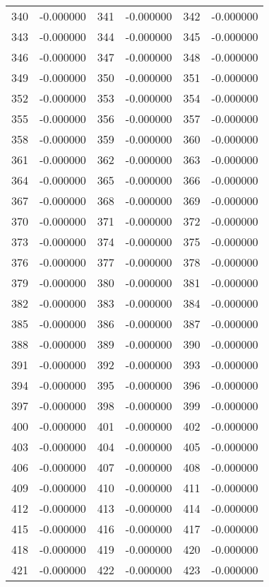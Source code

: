 \documentclass[12pt]{article}
\begin{document}
\begin{longtable}{@{}cc|cc|cc@{}}
340 & -0.000000 & 341 & -0.000000 & 342 & -0.000000 \\
343 & -0.000000 & 344 & -0.000000 & 345 & -0.000000 \\
346 & -0.000000 & 347 & -0.000000 & 348 & -0.000000 \\
349 & -0.000000 & 350 & -0.000000 & 351 & -0.000000 \\
352 & -0.000000 & 353 & -0.000000 & 354 & -0.000000 \\
355 & -0.000000 & 356 & -0.000000 & 357 & -0.000000 \\
358 & -0.000000 & 359 & -0.000000 & 360 & -0.000000 \\
361 & -0.000000 & 362 & -0.000000 & 363 & -0.000000 \\
364 & -0.000000 & 365 & -0.000000 & 366 & -0.000000 \\
367 & -0.000000 & 368 & -0.000000 & 369 & -0.000000 \\
370 & -0.000000 & 371 & -0.000000 & 372 & -0.000000 \\
373 & -0.000000 & 374 & -0.000000 & 375 & -0.000000 \\
376 & -0.000000 & 377 & -0.000000 & 378 & -0.000000 \\
379 & -0.000000 & 380 & -0.000000 & 381 & -0.000000 \\
382 & -0.000000 & 383 & -0.000000 & 384 & -0.000000 \\
385 & -0.000000 & 386 & -0.000000 & 387 & -0.000000 \\
388 & -0.000000 & 389 & -0.000000 & 390 & -0.000000 \\
391 & -0.000000 & 392 & -0.000000 & 393 & -0.000000 \\
394 & -0.000000 & 395 & -0.000000 & 396 & -0.000000 \\
397 & -0.000000 & 398 & -0.000000 & 399 & -0.000000 \\
400 & -0.000000 & 401 & -0.000000 & 402 & -0.000000 \\
403 & -0.000000 & 404 & -0.000000 & 405 & -0.000000 \\
406 & -0.000000 & 407 & -0.000000 & 408 & -0.000000 \\
409 & -0.000000 & 410 & -0.000000 & 411 & -0.000000 \\
412 & -0.000000 & 413 & -0.000000 & 414 & -0.000000 \\
415 & -0.000000 & 416 & -0.000000 & 417 & -0.000000 \\
418 & -0.000000 & 419 & -0.000000 & 420 & -0.000000 \\
421 & -0.000000 & 422 & -0.000000 & 423 & -0.000000 \\

\end{longtable}
\end{document}
